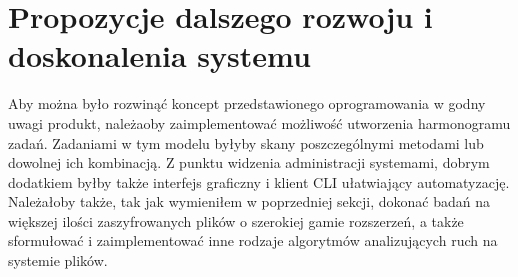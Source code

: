 \section{Propozycje dalszego rozwoju i doskonalenia systemu}

Aby można było rozwinąć koncept przedstawionego oprogramowania w godny uwagi produkt, należaoby zaimplementować możliwość utworzenia harmonogramu zadań. Zadaniami w tym modelu byłyby skany poszczególnymi metodami lub dowolnej ich kombinacją. Z punktu widzenia administracji systemami, dobrym dodatkiem byłby także interfejs graficzny i klient CLI ułatwiający automatyzację. Należałoby także, tak jak wymieniłem w poprzedniej sekcji, dokonać badań na większej ilości zaszyfrowanych plików o szerokiej gamie rozszerzeń, a także sformułować i zaimplementować inne rodzaje algorytmów analizujących ruch na systemie plików.